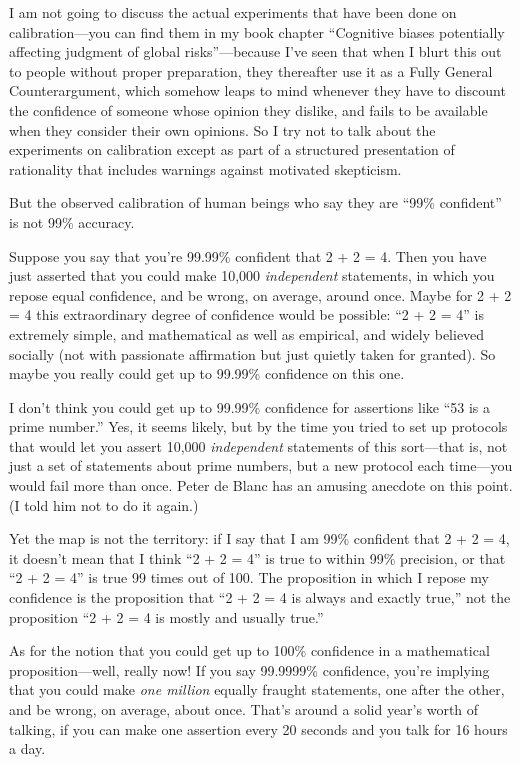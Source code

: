 {
 I am not going to discuss the actual experiments that have been
done on calibration---you can find them in my book chapter
``Cognitive biases potentially affecting judgment of
global risks''---because I've seen
that when I blurt this out to people without proper preparation, they
thereafter use it as a Fully General Counterargument, which somehow
leaps to mind whenever they have to discount the confidence of someone
whose opinion they dislike, and fails to be available when they
consider their own opinions. So I try not to talk about the experiments
on calibration except as part of a structured presentation of
rationality that includes warnings against motivated skepticism.}

{
 But the observed calibration of human beings who say they are
``99\% confident'' is not 99\%
accuracy.}

{
 Suppose you say that you're 99.99\% confident that
2 + 2 = 4. Then you have just asserted that you could make 10,000
\textit{independent} statements, in which you repose equal confidence,
and be wrong, on average, around once. Maybe for 2 + 2 = 4 this
extraordinary degree of confidence would be possible:
``2 + 2 = 4'' is extremely simple,
and mathematical as well as empirical, and widely believed socially
(not with passionate affirmation but just quietly taken for granted).
So maybe you really could get up to 99.99\% confidence on this one.}

{
 I don't think you could get up to 99.99\%
confidence for assertions like ``53 is a prime
number.'' Yes, it seems likely, but by the time you
tried to set up protocols that would let you assert 10,000
\textit{independent} statements of this sort---that is, not just a set
of statements about prime numbers, but a new protocol each time---you
would fail more than once. Peter de Blanc has an amusing anecdote on
this point. (I told him not to do it again.)}

{
 Yet the map is not the territory: if I say that I am 99\%
confident that 2 + 2 = 4, it doesn't mean that I think
``2 + 2 = 4'' is true to within 99\%
precision, or that ``2 + 2 = 4'' is
true 99 times out of 100. The proposition in which I repose my
confidence is the proposition that ``2 + 2 = 4 is
always and exactly true,'' not the proposition
``2 + 2 = 4 is mostly and usually
true.''}

{
 As for the notion that you could get up to 100\% confidence in a
mathematical proposition---well, really now! If you say 99.9999\%
confidence, you're implying that you could make
\textit{one million} equally fraught statements, one after the other,
and be wrong, on average, about once. That's around a
solid year's worth of talking, if you can make one
assertion every 20 seconds and you talk for 16 hours a day.}

